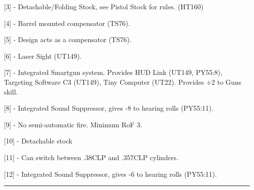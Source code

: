 [3] - Detachable/Folding Stock, see Pistol Stock for rules. (HT160)

[4] - Barrel mounted compensator (TS76).

[5] - Design acts as a compensator (TS76).

[6] - Laser Sight (UT149).

[7] - Integrated Smartgun system. Provides HUD Link (UT149, PY55:8), Targeting Software C3 (UT149), Tiny Computer (UT22). Provides +2 to Guns skill.

[8] - Integrated Sound Suppressor, gives -8 to hearing rolls (PY55:11).

[9] - No semi-automatic fire. Minimum RoF 3.

[10] - Detachable stock

[11] - Can switch between .38CLP and .357CLP cylinders.

[12] - Integrated Sound Suppressor, gives -6 to hearing rolls (PY55:11).

\par\rule{\textwidth}{0.5pt} 


